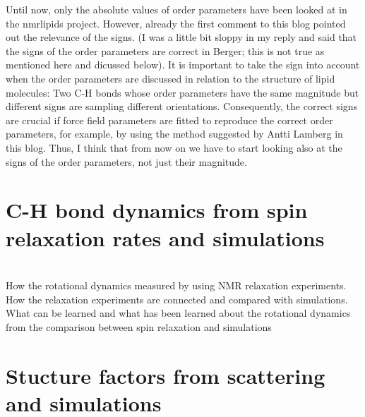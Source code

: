 \documentclass[aps,prl,superscriptaddress,twocolumn]{revtex4}
\begin{document}
Until now, only the absolute values of order parameters have been looked at in the nmrlipids project. However, already the first comment to this blog pointed out the relevance of the signs. (I was a little bit sloppy in my reply and said that the signs of the order parameters are correct in Berger; this is not true as mentioned here and dicussed below). It is important to take the sign into account when the order parameters are discussed in relation to the structure of lipid molecules: Two C-H bonds whose order parameters have the same magnitude but different signs are sampling different orientations. Consequently, the correct signs are crucial if force field parameters are fitted to reproduce the correct order parameters, for example, by using the method suggested by Antti Lamberg in this blog. Thus, I think that from now on we have to start looking also at the signs of the order parameters, not just their magnitude.



\section{C-H bond dynamics from spin relaxation rates and simulations}

\\[0.1cm]

\noindent How the rotational dynamics measured by using NMR relaxation experiments. \\
How the relaxation experiments are connected and compared with simulations. \\
What can be learned and what has been learned about the rotational dynamics from the comparison between spin relaxation and simulations \\[0.5 cm]


\section{Stucture factors from scattering and simulations}

 \\[0.1cm]

\\[0.1cm]
\end{document}
